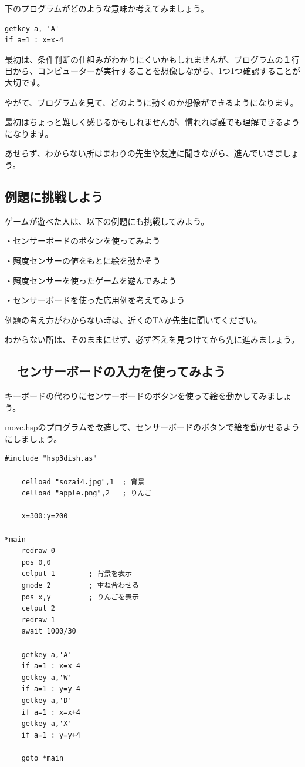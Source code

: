 下のプログラムがどのような意味か考えてみましょう。


\begin{lstlisting}[caption=プログラム,numbers=none]
getkey a, 'A'
if a=1 : x=x-4
\end{lstlisting}

最初は、条件判断の仕組みがわかりにくいかもしれませんが、プログラムの１行目から、コンピューターが実行することを想像しながら、1つ1つ確認することが大切です。

やがて、プログラムを見て、どのように動くのか想像ができるようになります。

最初はちょっと難しく感じるかもしれませんが、慣れれば誰でも理解できるようになります。

あせらず、わからない所はまわりの先生や友達に聞きながら、進んでいきましょう。

\subsection{例題に挑戦しよう}

ゲームが遊べた人は、以下の例題にも挑戦してみよう。

・センサーボードのボタンを使ってみよう

・照度センサーの値をもとに絵を動かそう

・照度センサーを使ったゲームを遊んでみよう

・センサーボードを使った応用例を考えてみよう


例題の考え方がわからない時は、近くのTAか先生に聞いてください。

わからない所は、そのままにせず、必ず答えを見つけてから先に進みましょう。

\newpage
\subsection{\useOmetoiExample　センサーボードの入力を使ってみよう}


\exampleinduction

キーボードの代わりにセンサーボードのボタンを使って絵を動かしてみましょう。

move.hspのプログラムを改造して、センサーボードのボタンで絵を動かせるようにしましょう。

\begin{lstlisting}[caption=move.hspのプログラム]
#include "hsp3dish.as"

    celload "sozai4.jpg",1  ; 背景
    celload "apple.png",2   ; りんご

    x=300:y=200

*main
    redraw 0
    pos 0,0
    celput 1        ; 背景を表示
    gmode 2         ; 重ね合わせる
    pos x,y         ; りんごを表示
    celput 2
    redraw 1
    await 1000/30

    getkey a,'A'
    if a=1 : x=x-4
    getkey a,'W'
    if a=1 : y=y-4
    getkey a,'D'
    if a=1 : x=x+4
    getkey a,'X'
    if a=1 : y=y+4

    goto *main
\end{lstlisting}

